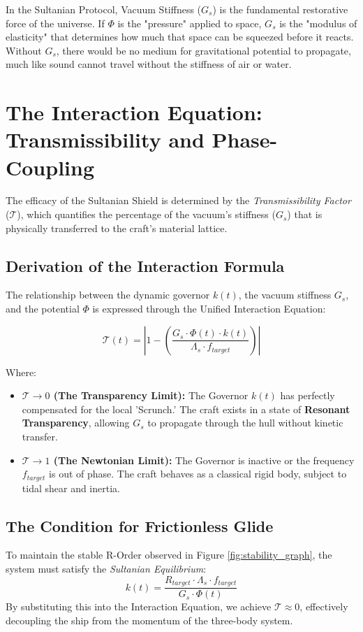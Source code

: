 \documentclass[11pt]{article}
\begin{document}
In the Sultanian Protocol, Vacuum Stiffness ($G_s$) is the fundamental restorative force of the universe. If $\Phi$ is the "pressure" applied to space, $G_s$ is the "modulus of elasticity" that determines how much that space can be squeezed before it reacts.
\\Without $G_s$, there would be no medium for gravitational potential to propagate, much like sound cannot travel without the stiffness of air or water.

\section{The Interaction Equation: Transmissibility and Phase-Coupling}

The efficacy of the Sultanian Shield is determined by the \textit{Transmissibility Factor} ($\mathcal{T}$), which quantifies the percentage of the vacuum's stiffness ($G_s$) that is physically transferred to the craft's material lattice. 

\subsection{Derivation of the Interaction Formula}
The relationship between the dynamic governor $k(t)$, the vacuum stiffness $G_s$, and the potential $\Phi$ is expressed through the Unified Interaction Equation:

\begin{equation}
    \mathcal{T}(t) = \left| 1 - \left( \frac{G_s \cdot \Phi(t) \cdot k(t)}{\Lambda_s \cdot f_{target}} \right) \right|
\end{equation}

Where:
\begin{itemize}
    \item \textbf{$\mathcal{T} \to 0$ (The Transparency Limit):} The Governor $k(t)$ has perfectly compensated for the local 'Scrunch.' The craft exists in a state of \textbf{Resonant Transparency}, allowing $G_s$ to propagate through the hull without kinetic transfer.
    \item \textbf{$\mathcal{T} \to 1$ (The Newtonian Limit):} The Governor is inactive or the frequency $f_{target}$ is out of phase. The craft behaves as a classical rigid body, subject to tidal shear and inertia.
\end{itemize}

\subsection{The Condition for Frictionless Glide}
To maintain the stable R-Order observed in Figure \ref{fig:stability_graph}, the system must satisfy the \textit{Sultanian Equilibrium}:
\begin{equation}
    k(t) = \frac{R_{target} \cdot \Lambda_s \cdot f_{target}}{G_s \cdot \Phi(t)}
\end{equation}
By substituting this into the Interaction Equation, we achieve $\mathcal{T} \approx 0$, effectively decoupling the ship from the momentum of the three-body system.\\
\end{document}
